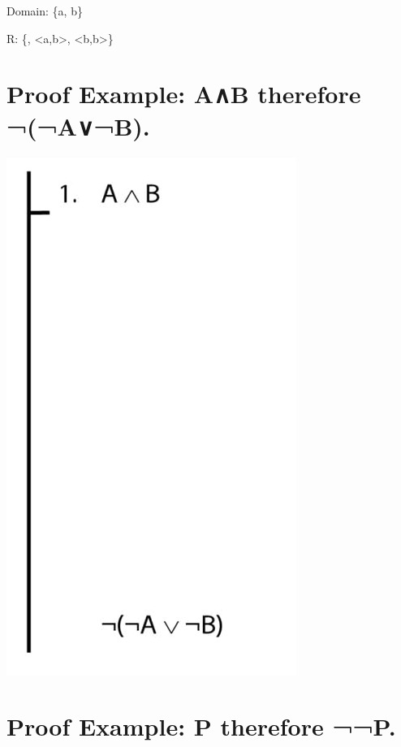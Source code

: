 \documentclass[12pt]{extarticle}
\begin{document}
\begin{multicols*}{3}
\hspace{3mm} Domain: \{a, b\}
 
\hspace{3mm} R: \{<a,a>, <a,b>, <b,b>\}
 
 
 
\section{Proof Example: A∧B therefore ¬(¬A∨¬B).}
 
\begin{center}
\includegraphics[scale=0.3]{img/unit_822_proof.png}
\end{center}
 
 
\section{Proof Example: P therefore ¬¬P.}
 

\end{multicols*}
\end{document}
